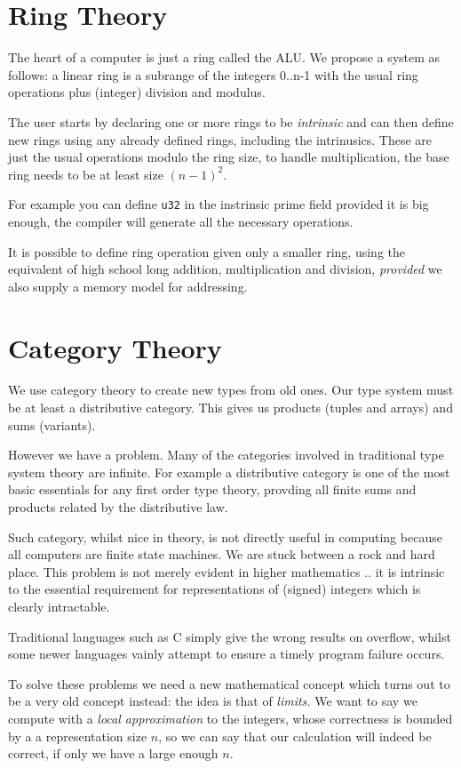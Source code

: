\documentclass[oneside]{book}
\theoremstyle{plain}
\theoremstyle{definition}
\theoremstyle{plain}
\begin{document}
\section{Ring Theory}
The heart of a computer is just a ring called the ALU. We propose
a system as follows: a linear ring is a subrange of the integers
0..n-1 with the usual ring operations plus (integer) division and
modulus.

The user starts by declaring one or more rings to be {\em intrinsic}
and can then define new rings using any already defined rings, including
the intrinusics. These are just the usual operations modulo the ring size,
to handle multiplication, the base ring needs to be at least size $(n-1)^2$.

For example you can define \verb$u32$ in the instrinsic prime field
provided it is big enough, the compiler will generate all the necessary
operations.

It is possible to define ring operation given only a smaller ring,
using the equivalent of high school long addition, multiplication
and division, {\em provided} we also supply a memory model for
addressing.

\section{Category Theory}
We use category theory to create new types from old ones.
Our type system must be at least a distributive category.
This gives us products (tuples and arrays) and sums (variants).

However we have a problem. Many of the categories involved in traditional
type system theory are infinite. For example a distributive category is
one of the most basic essentials for any first order type theory,
provding all finite sums and products related by the distributive law.

Such category, whilst nice in theory, is not directly useful in 
computing because all computers are finite state machines. We are stuck 
between a rock and hard place. This problem is not merely evident in
higher mathematics .. it is intrinsic to the essential requirement for representations
of (signed) integers which is clearly intractable.

Traditional languages such as C simply give the wrong results on overflow,
whilst some newer languages vainly attempt to ensure a timely program
failure occurs.


To solve these problems we need a new mathematical concept which turns out
to be a very old concept instead: the idea is that of {\em limits.}
We want to say we compute with a {\em local approximation} to the integers,
whose correctness is bounded by a a representation size $n$, so we can say
that our calculation will indeed be correct, if only we have a large enough $n$.
\end{document}
